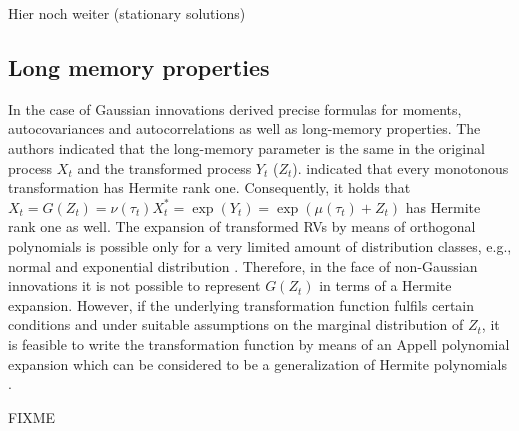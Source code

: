 \documentclass[12pt]{article}
\begin{document}
Hier noch weiter (stationary solutions)


\subsection{Long memory properties}
In the case of Gaussian innovations \citet{beran2015modelling} derived precise formulas for moments, autocovariances and autocorrelations as well as long-memory properties. The authors indicated that the long-memory parameter is the same in the original process $X_t$ and the transformed process $Y_t$ ($Z_t$). \citet{menendez2013trend} indicated that every monotonous transformation has Hermite rank one. Consequently, it holds that $X_t=G(Z_t) =\nu(\tau_t) X^*_t=\exp(Y_t)=\exp(\mu(\tau_t)+Z_t)$ has Hermite rank one as well. The expansion of transformed RVs by means of orthogonal polynomials is possible only for a very limited amount of distribution classes, e.g., normal and exponential distribution \citep{beran2013limit}.  Therefore, in the face of non-Gaussian innovations it is not possible to represent $G(Z_t)$ in terms of a Hermite expansion. However, if the underlying transformation function fulfils  certain conditions and under suitable assumptions on the marginal distribution of $Z_t$, it is feasible to write the transformation function by means of an Appell polynomial expansion which can be considered to be a generalization of Hermite polynomials \citep{schutzner2009asymptotic}.

FIXME
%
\end{document}
